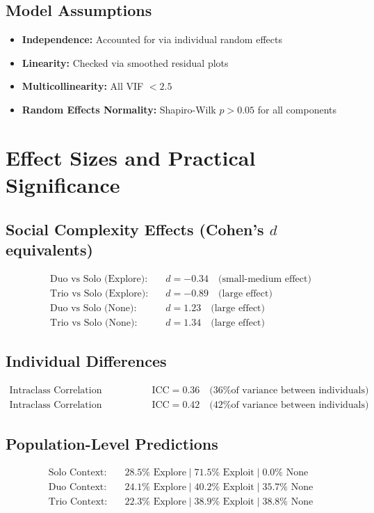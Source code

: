 \documentclass[11pt,a4paper]{article}
\begin{document}
\subsection{Model Assumptions}
\begin{itemize}
    \item[\checkmark] \textbf{Independence:} Accounted for via individual random effects
    \item[\checkmark] \textbf{Linearity:} Checked via smoothed residual plots
    \item[\checkmark] \textbf{Multicollinearity:} All VIF $< 2.5$
    \item[\checkmark] \textbf{Random Effects Normality:} Shapiro-Wilk $p > 0.05$ for all components
\end{itemize}

\section{Effect Sizes and Practical Significance}

\subsection{Social Complexity Effects (Cohen's $d$ equivalents)}
\begin{align}
\text{Duo vs Solo (Explore):} &\quad d = -0.34 \quad \text{(small-medium effect)}\\
\text{Trio vs Solo (Explore):} &\quad d = -0.89 \quad \text{(large effect)}\\
\text{Duo vs Solo (None):} &\quad d = 1.23 \quad \text{(large effect)}\\
\text{Trio vs Solo (None):} &\quad d = 1.34 \quad \text{(large effect)}
\end{align}

\subsection{Individual Differences}
\begin{align}
\text{Intraclass Correlation (Explore):} &\quad \text{ICC} = 0.36 \quad \text{(36\% of variance between individuals)}\\
\text{Intraclass Correlation (None):} &\quad \text{ICC} = 0.42 \quad \text{(42\% of variance between individuals)}
\end{align}

\subsection{Population-Level Predictions}
\begin{align}
\text{Solo Context:} &\quad 28.5\% \text{ Explore} \mid 71.5\% \text{ Exploit} \mid 0.0\% \text{ None}\\
\text{Duo Context:} &\quad 24.1\% \text{ Explore} \mid 40.2\% \text{ Exploit} \mid 35.7\% \text{ None}\\
\text{Trio Context:} &\quad 22.3\% \text{ Explore} \mid 38.9\% \text{ Exploit} \mid 38.8\% \text{ None}
\end{align}
\end{document}
